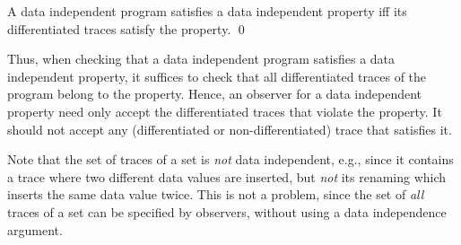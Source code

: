 \begin{theorem}
\label{thm:differentiated}
A data independent program satisfies a data independent property
iff its differentiated traces satisfy the property.
\qed
\end{theorem}
%
Thus, when checking that a data independent program satisfies a
data independent property, 
it suffices to check that all differentiated traces of the program 
belong to the property. 
Hence, an observer for a data independent property need only accept the
differentiated traces that violate the property. It should not accept any
(differentiated or non-differentiated) trace that satisfies it. 
%

Note that the set of traces of a set is {\em not}
data independent, e.g., since it contains a trace
where two different data values are inserted, but {\em not} its renaming
which inserts the same data value twice. This is not a problem,
since the set of {\em all} traces of a set can be specified by observers,
without using a data independence argument.

